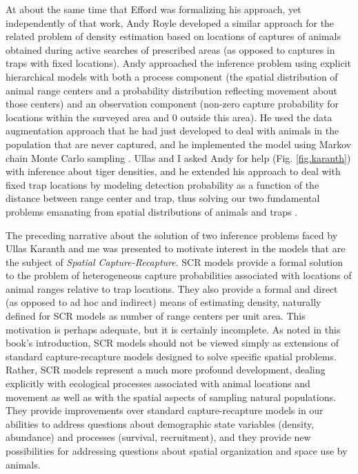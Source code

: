 At about the same time that Efford was formalizing his approach, yet
independently of that work, Andy Royle developed a similar approach
for the related problem of density estimation based on locations of
captures of animals obtained during active searches of prescribed
areas (as opposed to captures in traps with fixed locations). Andy
approached the inference problem using explicit hierarchical models
with both a process component (the spatial distribution of animal
range centers and a probability distribution reflecting movement about
those centers) and an observation component (non-zero capture
probability for locations within the surveyed area and 0 outside this
area). He used the data augmentation approach that he had just
developed \citep{royle_etal:2007} to deal with animals in the
population that are never captured, and he implemented the model using
Markov chain Monte Carlo sampling \citep{royle_young:2008}.  Ullas and
I asked Andy for help (Fig. \ref{fig.karanth}) with inference about
tiger densities, and he extended his approach to deal with fixed trap
locations by modeling detection probability as a function of the
distance between range center and trap, thus solving our two
fundamental problems emanating from spatial distributions of animals
and traps \citep{royle_etal:2009jae, royle_etal:2009ecol}.

The preceding narrative about the solution of two inference problems
faced by Ullas Karanth and me was presented to motivate interest in
the models that are the subject of {\it Spatial
  Capture-Recapture}. SCR models provide a formal solution to the
problem of heterogeneous capture probabilities associated with
locations of animal ranges relative to trap locations. They also
provide a formal and direct (as opposed to ad hoc and indirect) means
of estimating density, naturally defined for SCR models as number of
range centers per unit area.  This motivation is perhaps adequate, but
it is certainly incomplete. As noted in this book's introduction, SCR
models should not be viewed simply as extensions of standard
capture-recapture models designed to solve specific spatial
problems. Rather, SCR models represent a much more profound
development, dealing explicitly with ecological processes associated
with animal locations and movement as well as with the spatial aspects
of sampling natural populations. They provide improvements over
standard capture-recapture models in our abilities to address
questions about demographic state variables (density, abundance) and
processes (survival, recruitment), and they provide new possibilities
for addressing questions about spatial organization and space use by
animals.

